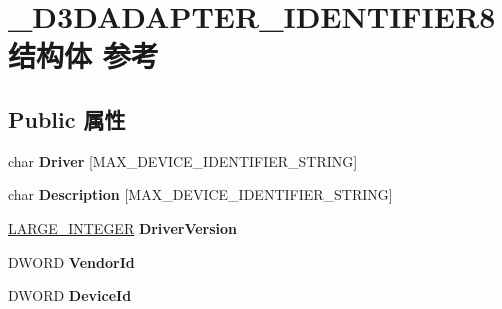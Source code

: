 \hypertarget{struct___d3_d_a_d_a_p_t_e_r___i_d_e_n_t_i_f_i_e_r8}{}\section{\+\_\+\+D3\+D\+A\+D\+A\+P\+T\+E\+R\+\_\+\+I\+D\+E\+N\+T\+I\+F\+I\+E\+R8结构体 参考}
\label{struct___d3_d_a_d_a_p_t_e_r___i_d_e_n_t_i_f_i_e_r8}
\subsection*{Public 属性}
\begin{DoxyCompactItemize}
\item 
\mbox{\label{struct___d3_d_a_d_a_p_t_e_r___i_d_e_n_t_i_f_i_e_r8_a86d764c00ad2be2483806d54c9896c37}} 
char {\bfseries Driver} \mbox{[}M\+A\+X\+\_\+\+D\+E\+V\+I\+C\+E\+\_\+\+I\+D\+E\+N\+T\+I\+F\+I\+E\+R\+\_\+\+S\+T\+R\+I\+NG\mbox{]}
\item 
\mbox{\label{struct___d3_d_a_d_a_p_t_e_r___i_d_e_n_t_i_f_i_e_r8_aef6d42a90bd0026cd9728b51e98383d4}} 
char {\bfseries Description} \mbox{[}M\+A\+X\+\_\+\+D\+E\+V\+I\+C\+E\+\_\+\+I\+D\+E\+N\+T\+I\+F\+I\+E\+R\+\_\+\+S\+T\+R\+I\+NG\mbox{]}
\item 
\mbox{\label{struct___d3_d_a_d_a_p_t_e_r___i_d_e_n_t_i_f_i_e_r8_a2448e864919bc081adc5526b95d41cab}} 
\hyperlink{union___l_a_r_g_e___i_n_t_e_g_e_r}{L\+A\+R\+G\+E\+\_\+\+I\+N\+T\+E\+G\+ER} {\bfseries Driver\+Version}
\item 
\mbox{\label{struct___d3_d_a_d_a_p_t_e_r___i_d_e_n_t_i_f_i_e_r8_a9e07151e8c7cc9cf60e96904181ff26a}} 
D\+W\+O\+RD {\bfseries Vendor\+Id}
\item 
\mbox{\label{struct___d3_d_a_d_a_p_t_e_r___i_d_e_n_t_i_f_i_e_r8_acf1f03c9f225c21f3af3b78b79b8e0fd}} 
D\+W\+O\+RD {\bfseries Device\+Id}
\item 
\mbox{\label{struct___d3_d_a_d_a_p_t_e_r___i_d_e_n_t_i_f_i_e_r8_a7d2d5fd004e5f68226a5eb62d0d5a4bc}} 

\end{DoxyCompactItemize}
